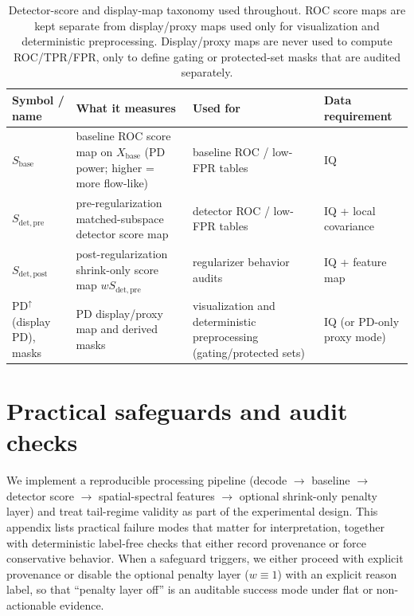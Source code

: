 \documentclass[11pt]{article}
\begin{document}
\begin{table}[t]
\centering
\small
\begingroup
\setlength{\tabcolsep}{4pt}
\begin{tabular}{@{}P{2.8cm} P{5.3cm} P{4.2cm} P{2.6cm}@{}}
\hline
Symbol / name & What it measures & Used for & Data requirement \\
\hline
$S_{\mathrm{base}}$ & baseline ROC score map on $X_{\mathrm{base}}$ (PD power; higher = more flow-like) & baseline ROC / low-FPR tables & IQ \\
$S_{\mathrm{det,pre}}$ & pre-regularization matched-subspace detector score map & detector ROC / low-FPR tables & IQ + local covariance \\
$S_{\mathrm{det,post}}$ & post-regularization shrink-only score map $wS_{\mathrm{det,pre}}$ & regularizer behavior audits & IQ + feature map \\
$\mathrm{PD}^{\uparrow}$ (display PD), masks & PD display/proxy map and derived masks & visualization and deterministic preprocessing (gating/protected sets) & IQ (or PD-only proxy mode) \\
\hline
\end{tabular}
\endgroup
\caption{Detector-score and display-map taxonomy used throughout. ROC score maps are kept separate from display/proxy maps used only for visualization and deterministic preprocessing. Display/proxy maps are never used to compute ROC/TPR/FPR, only to define gating or protected-set masks that are audited separately.}
\label{tab:score_taxonomy}
\end{table}





\section{Practical safeguards and audit checks}
\label{app:failure-modes}

We implement a reproducible processing pipeline (decode $\rightarrow$ baseline $\rightarrow$ detector score $\rightarrow$ spatial-spectral features $\rightarrow$ optional shrink-only penalty layer) and treat tail-regime validity as part of the experimental design. This appendix lists practical failure modes that matter for interpretation, together with deterministic label-free checks that either record provenance or force conservative behavior. When a safeguard triggers, we either proceed with explicit provenance or disable the optional penalty layer ($w\equiv 1$) with an explicit reason label, so that ``penalty layer off'' is an auditable success mode under flat or non-actionable evidence.
\end{document}
